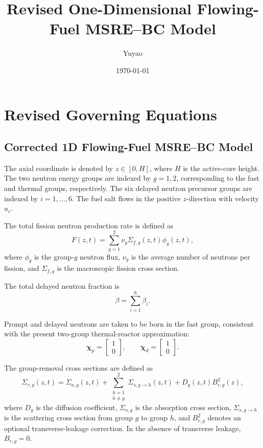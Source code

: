 \documentclass[a4paper,12pt]{article}
\title{Revised One-Dimensional Flowing-Fuel MSRE--BC Model}
\author{Yuyao}
\date{\today}
\begin{document}
\maketitle

\section*{Revised Governing Equations}

\subsection{Corrected 1D Flowing-Fuel MSRE--BC Model}

The axial coordinate is denoted by $z \in [0,H]$, where $H$ is the
active-core height. The two neutron energy groups are indexed by
$g = 1,2$, corresponding to the fast and thermal groups, respectively.
The six delayed neutron precursor groups are indexed by
$i = 1,\ldots,6$. The fuel salt flows in the positive $z$-direction
with velocity $u_c$.

The total fission neutron production rate is defined as
\begin{equation}
F(z,t)
=
\sum_{g=1}^{2}
\nu_g \Sigma_{f,g}(z,t)\phi_g(z,t),
\label{eq:fission_source}
\end{equation}
where $\phi_g$ is the group-$g$ neutron flux,
$\nu_g$ is the average number of neutrons per fission, and
$\Sigma_{f,g}$ is the macroscopic fission cross section.

The total delayed neutron fraction is
\begin{equation}
\beta = \sum_{i=1}^{6}\beta_i.
\label{eq:beta_total}
\end{equation}

Prompt and delayed neutrons are taken to be born in the fast group,
consistent with the present two-group thermal-reactor approximation:
\begin{equation}
\boldsymbol{\chi}_p=
\begin{bmatrix}
1\\
0
\end{bmatrix},
\qquad
\boldsymbol{\chi}_d=
\begin{bmatrix}
1\\
0
\end{bmatrix}.
\label{eq:chi_definition}
\end{equation}

The group-removal cross sections are defined as
\begin{equation}
\Sigma_{r,g}(z,t)
=
\Sigma_{a,g}(z,t)
+
\sum_{\substack{h=1\\h\neq g}}^{2}
\Sigma_{s,g\rightarrow h}(z,t)
+
D_g(z,t)B_{r,g}^{2}(z),
\label{eq:removal_general}
\end{equation}
where $D_g$ is the diffusion coefficient, $\Sigma_{a,g}$ is the
absorption cross section, $\Sigma_{s,g\rightarrow h}$ is the scattering
cross section from group $g$ to group $h$, and $B_{r,g}^{2}$ denotes an
optional transverse-leakage correction. In the absence of transverse
leakage, $B_{r,g}=0$.
\end{document}
